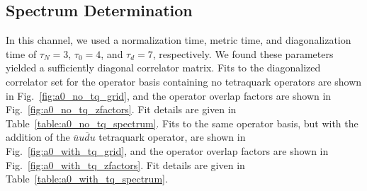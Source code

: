 \subsection{Spectrum Determination}
In this channel, we used a normalization time, metric time, and diagonalization time of $\tau_N=3$, $\tau_0=4$, and $\tau_d=7$, respectively. We found these parameters yielded a sufficiently diagonal correlator matrix. Fits to the diagonalized correlator set for the operator basis containing no tetraquark operators are shown in Fig.~\ref{fig:a0_no_tq_grid}, and the operator overlap factors are shown in Fig.~\ref{fig:a0_no_tq_zfactors}. Fit details are given in Table~\ref{table:a0_no_tq_spectrum}. Fits to the same operator basis, but with the addition of the $\overline u u \overline d u$ tetraquark operator, are shown in Fig.~\ref{fig:a0_with_tq_grid}, and the operator overlap factors are shown in Fig.~\ref{fig:a0_with_tq_zfactors}. Fit details are given in Table~\ref{table:a0_with_tq_spectrum}.

